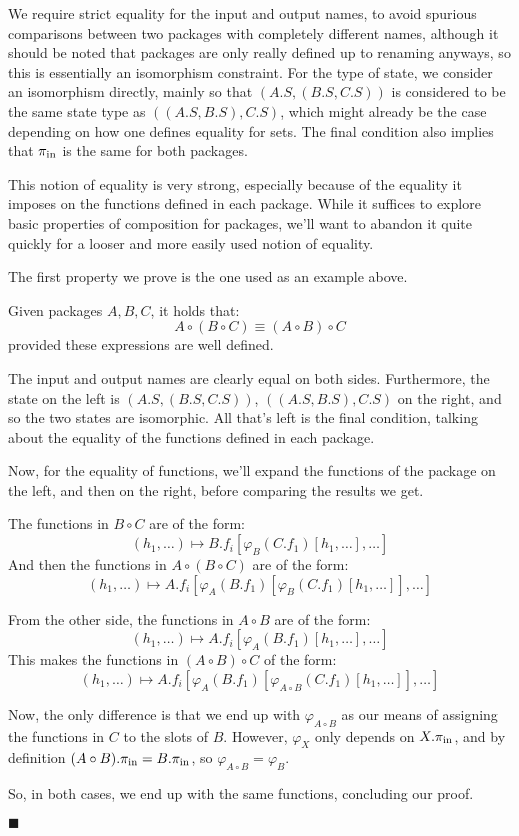We require strict equality for the input and output names,
to avoid spurious comparisons between two packages with completely different names,
although it should be noted that packages are only really defined up to renaming anyways,
so this is essentially an isomorphism constraint.
For the type of state, we consider an isomorphism directly,
mainly so that $(A.S, (B.S, C.S))$ is considered to be the same state
type as $((A.S, B.S), C.S)$, which might already be the case depending on
how one defines equality for sets.
The final condition also implies that $\pi_{\text{in}}$ is the same
for both packages.

This notion of equality is very strong, especially because of the equality
it imposes on the functions defined in each package.
While it suffices to explore basic properties of composition for packages,
we'll want to abandon it quite quickly for a looser and more easily
used notion of equality.

The first property we prove is the one used as an example above.

\begin{lemma}
    Given packages $A, B, C$, it holds that:
    $$
    A \circ (B \circ C) \equiv (A \circ B) \circ C
    $$
    provided these expressions are well defined.

     The input and output names are clearly equal on both sides.
    Furthermore, the state on the left is $(A.S, (B.S, C.S))$,
    $((A.S, B.S), C.S)$ on the right, and so the two states are isomorphic.
    All that's left is the final condition, talking about the equality
    of the functions defined in each package.

    Now, for the equality of functions, we'll expand the functions
    of the package on the left, and then on the right, before comparing
    the results we get.

    The functions in $B \circ C$ are of the form:
    $$
    (h_1, \ldots) \mapsto B.f_i[\varphi_{B}(C.f_1)[h_1, \ldots], \ldots]
    $$
    And then the functions in $A \circ (B \circ C)$ are of the form:
    $$
    (h_1, \ldots) \mapsto A.f_i[\varphi_{A}(B.f_1)[\varphi_{B}(C.f_1)[h_1, \ldots]], \ldots]
    $$

    From the other side, the functions in $A \circ B$ are of the form:
    $$
    (h_1, \ldots) \mapsto A.f_i[\varphi_{A}(B.f_1)[h_1, \ldots], \ldots]
    $$
    This makes the functions in $(A \circ B) \circ C$ of the form:
    $$
    (h_1, \ldots) \mapsto A.f_i[\varphi_{A}(B.f_1)[\varphi_{A \circ B}(C.f_1)[h_1, \ldots]], \ldots]
    $$

    Now, the only difference is that we end up with $\varphi_{A \circ B}$
    as our means of assigning the functions in $C$ to the slots
    of $B$.
    However, $\varphi_{X}$ only depends on $X.\pi_{\text{in}}$,
    and by definition $(A \circ B).\pi_{\text{in}} = B.\pi_{\text{in}}$,
    so $\varphi_{A \circ B} = \varphi_B$.

    So, in both cases, we end up with the same functions, concluding
    our proof.

    $\blacksquare$
\end{lemma}

